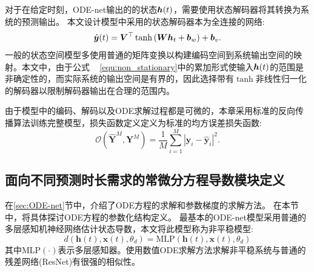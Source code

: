 对于在给定时刻，ODE-net输出的的状态$\boldsymbol h(t)$，需要使用状态解码器将其转换为系统的预测输出。
本文设计模型中采用的状态解码器本为全连接的网络:
\begin{equation}
    \hat{\boldsymbol y}(t) = \boldsymbol{V}^{\top} \tanh \left(\boldsymbol{W}\boldsymbol{h}_{t}+\boldsymbol{b}_{w}\right)+\boldsymbol b_{v}.
\end{equation}
一般的状态空间模型多使用普通的矩阵变换以构建编码空间到系统输出空间的映射。本文中，由于公式
~ \eqref{equ:non_stationary}中的累加形式使输入$\boldsymbol h(t)$的范围是非确定性的，而实际系统的输出空间是有界的，因此选择带有$\tanh$非线性归一化的解码器以限制解码器输出在合理的范围内。

由于模型中的编码、解码以及ODE求解过程都是可微的，本章采用标准的反向传播算法训练完整模型，损失函数定义定义为标准的均方误差损失函数:
\begin{equation}
\label{equ:mse_loss}
\mathcal{O}\left(\hat{\boldsymbol Y}^M, \boldsymbol{Y}^M\right)=\frac{1}{M} \sum_{i=1}^{M}\left|\boldsymbol y_{i}-\hat{\boldsymbol y}_{i}\right|^2.
\end{equation}

\subsection{面向不同预测时长需求的常微分方程导数模块定义}
\label{sec:derivative}
在\ref{sec:ODE-net}节中，介绍了ODE方程的求解和参数梯度的求解方法。
在本节中，将具体探讨ODE方程的参数化结构定义。
最基本的ODE-net模型采用普通的多层感知机神经网络估计状态导数\cite{chen2018neural}，本文将此模型称为非平稳模型:
\begin{equation}
\label{equ:non_stationary}
d\left(\boldsymbol{h}(t), \boldsymbol{x}(t), \theta_{d}\right)=\text{MLP}\left(\boldsymbol{h}(t), \boldsymbol{x}(t), \theta_{d}\right)
\end{equation}
其中$\text{MLP}(\cdot)$表示多层感知器。使用数值ODE求解方法求解非平稳系统与普通的残差网络(ResNet)有很强的相似性。

